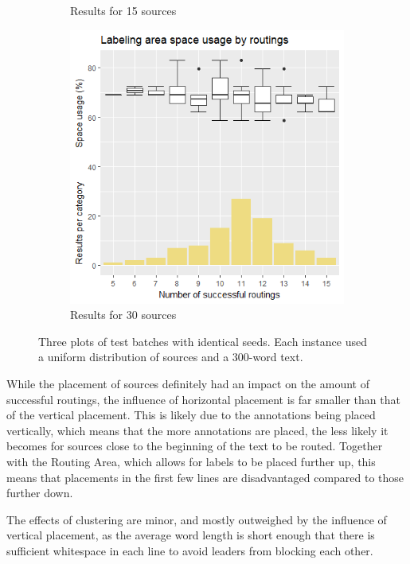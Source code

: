 \documentclass[11pt,a4paper]{vutinfth}
\begin{document}
\begin{figure}
\begin{subfigure}[b]{/7}
 		\caption{\label{fig:15u}Results for 15 sources}
 	\end{subfigure}
    \begin{subfigure}[b]{/7}
		 \centering
		 \includegraphics[scale=0.35]{Rplot_30u.png}
		 \caption{\label{fig:30u}Results for 30 sources}
    \end{subfigure}
 
 	\caption{Three plots of test batches with identical seeds. Each instance used a uniform distribution of sources and a 300-word text.}
 	\label{fig:uniformstats}
 \end{figure}

While the placement of sources definitely had an impact on the amount of successful routings, the influence of horizontal placement is far smaller than that of the vertical placement. This is likely due to the annotations being placed vertically, which means that the more annotations are placed, the less likely it becomes for sources close to the beginning of the text to be routed. Together with the Routing Area, which allows for labels to be placed further up, this means that placements in the first few lines are disadvantaged compared to those further down.

The effects of clustering are minor, and mostly outweighed by the influence of vertical placement, as the average word length is short enough that there is sufficient whitespace in each line to avoid leaders from blocking each other. 
\end{document}
